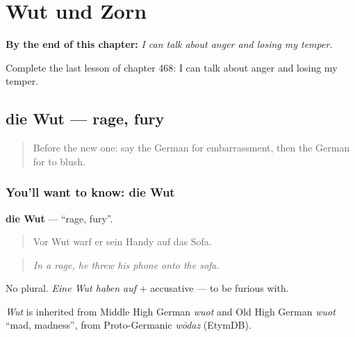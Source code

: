 
\chapter{Wut und Zorn}
\label{ch:ge-wut-und-zorn}

\begin{chapteropening}
\textbf{By the end of this chapter:} \emph{I can talk about anger and losing my temper.}

Complete the last lesson of chapter 468: I can talk about anger and losing my temper.
\end{chapteropening}

\section[die Wut]{die Wut — rage, fury}

\label{lesson:GE-C468-wut}



\begin{quote}
Before the new one: say the German for embarrassment, then the German for to blush.
\end{quote}

\subsection*{You'll want to know: die Wut}
\textbf{die Wut} — \textquotedblleft{}rage, fury\textquotedblright{}.

\begin{quote}
Vor Wut warf er sein Handy auf das Sofa.
\end{quote}

\begin{quote}
\emph{In a rage, he threw his phone onto the sofa.}
\end{quote}

No plural. \emph{Eine Wut haben auf} + accusative — to be furious with.

\begin{cousinweb}
\emph{Wut} is inherited from Middle High German \emph{wuot} and Old High German \emph{wuot} \textquotedblleft{}mad, madness\textquotedblright{}, from Proto-Germanic \emph{wōdaz} (EtymDB).
\end{cousinweb}


